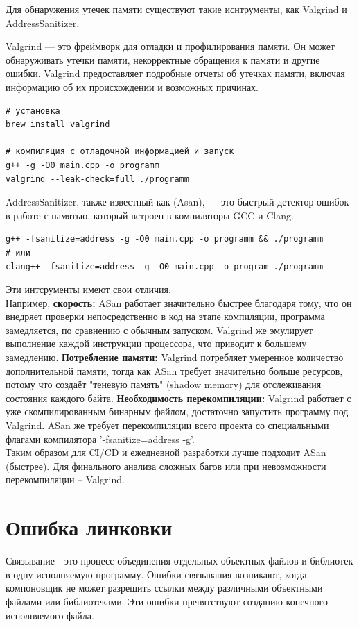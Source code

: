 \documentclass[14pt]{extreport}
\begin{document}
Для обнаружения утечек памяти существуют такие иснтрументы, как Valgrind и AddressSanitizer.

Valgrind — это фреймворк для отладки и профилирования памяти. Он может обнаруживать утечки памяти, некорректные обращения к памяти и другие ошибки. Valgrind предоставляет подробные отчеты об утечках памяти, включая информацию об их происхождении и возможных причинах.
\begin{verbatim}
# установка
brew install valgrind

# компиляция с отладочной информацией и запуск 
g++ -g -O0 main.cpp -o programm
valgrind --leak-check=full ./programm
\end{verbatim}

AddressSanitizer, также известный как (Asan), — это быстрый детектор ошибок в работе с памятью, который встроен в компиляторы GCC и Clang.
\begin{verbatim}
g++ -fsanitize=address -g -O0 main.cpp -o programm && ./programm
# или
clang++ -fsanitize=address -g -O0 main.cpp -o program ./programm
\end{verbatim}

Эти интсрументы имеют свои отличия. \\
Например, \textbf{скорость:} ASan работает значительно быстрее благодаря тому, что он внедряет проверки непосредственно в код на этапе компиляции, программа замедляется, по сравнению с обычным запуском. Valgrind же эмулирует выполнение каждой инструкции процессора, что приводит к большему замедлению. 
\textbf{Потребление памяти:} Valgrind потребляет умеренное количество дополнительной памяти, тогда как ASan требует значительно больше ресурсов, потому что создаёт "теневую память" (shadow memory) для отслеживания состояния каждого байта. 
\textbf{Необходимость перекомпиляции:} Valgrind работает с уже скомпилированным бинарным файлом, достаточно запустить программу под Valgrind. ASan же требует перекомпиляции всего проекта со специальными флагами компилятора '-fsanitize=address -g'.\\
Таким образом для CI/CD и ежедневной разработки лучше подходит ASan (быстрее). Для финального анализа сложных багов или при невозможности перекомпиляции -- Valgrind. 

\newpage
{\centering\section{Ошибка линковки}}
Связывание - это процесс объединения отдельных объектных файлов и библиотек в одну исполняемую программу. Ошибки связывания возникают, когда компоновщик не может разрешить ссылки между различными объектными файлами или библиотеками. Эти ошибки препятствуют созданию конечного исполняемого файла.
\end{document}

